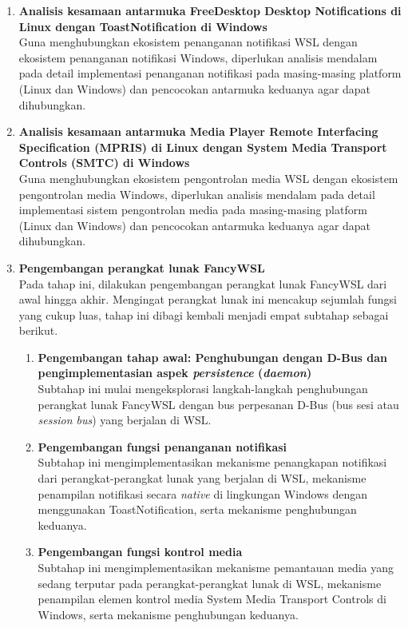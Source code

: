 \begin{enumerate}
    \item \textbf{Analisis kesamaan antarmuka FreeDesktop Desktop Notifications di Linux dengan ToastNotification di Windows}\\
    Guna menghubungkan ekosistem penanganan notifikasi WSL dengan ekosistem penanganan notifikasi Windows, diperlukan analisis mendalam pada detail implementasi penanganan notifikasi pada masing-masing platform (Linux dan Windows) dan pencocokan antarmuka keduanya agar dapat dihubungkan.

    \item \textbf{Analisis kesamaan antarmuka Media Player Remote Interfacing Specification (MPRIS) di Linux dengan System Media Transport Controls (SMTC) di Windows}\\
    Guna menghubungkan ekosistem pengontrolan media WSL dengan ekosistem pengontrolan media Windows, diperlukan analisis mendalam pada detail implementasi sistem pengontrolan media pada masing-masing platform (Linux dan Windows) dan pencocokan antarmuka keduanya agar dapat dihubungkan.

    \item \textbf{Pengembangan perangkat lunak FancyWSL}\\
    Pada tahap ini, dilakukan pengembangan perangkat lunak FancyWSL dari awal hingga akhir. Mengingat perangkat lunak ini mencakup sejumlah fungsi yang cukup luas, tahap ini dibagi kembali menjadi empat subtahap sebagai berikut.
    \begin{enumerate}
        \item \textbf{Pengembangan tahap awal: Penghubungan dengan D-Bus dan pengimplementasian aspek \textit{persistence} (\textit{daemon})}\\
        Subtahap ini mulai mengeksplorasi langkah-langkah penghubungan perangkat lunak FancyWSL dengan bus perpesanan D-Bus (bus sesi atau \textit{session bus}) yang berjalan di WSL.
        
        \item \textbf{Pengembangan fungsi penanganan notifikasi}\\
        Subtahap ini mengimplementasikan mekanisme penangkapan notifikasi dari perangkat-perangkat lunak yang berjalan di WSL, mekanisme penampilan notifikasi secara \textit{native} di lingkungan Windows dengan menggunakan ToastNotification, serta mekanisme penghubungan keduanya.

        \item \textbf{Pengembangan fungsi kontrol media}\\
        Subtahap ini mengimplementasikan mekanisme pemantauan media yang sedang terputar pada perangkat-perangkat lunak di WSL, mekanisme penampilan elemen kontrol media System Media Transport Controls di Windows, serta mekanisme penghubungan keduanya.
    \end{enumerate}
\end{enumerate}

